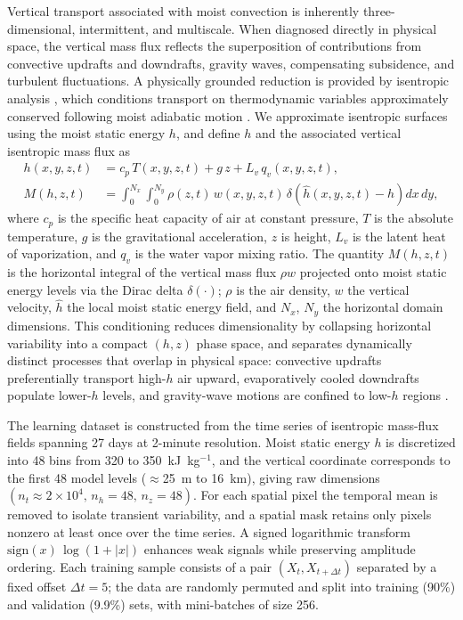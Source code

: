\documentclass[
    aps,
    prl,
    reprint,
    superscriptaddress,
    amsmath,amssymb,
    nofootinbib,
    floatfix
]{revtex4-2}
\begin{document}
Vertical transport associated with moist convection is inherently three-dimensional, intermittent, and multiscale. When diagnosed directly in physical space, the vertical mass flux reflects the superposition of contributions from convective updrafts and downdrafts, gravity waves, compensating subsidence, and turbulent fluctuations. A physically grounded reduction is provided by isentropic analysis \cite{pauluis2013isentropic}, which conditions transport on thermodynamic variables approximately conserved following moist adiabatic motion \cite{chen2022crucial}. We approximate isentropic surfaces using the moist static energy $h$, and define $h$ and the associated vertical isentropic mass flux as
\begin{align}
    h(x,y,z,t) & = c_p\, T(x,y,z,t)+ g\, z + L_v\, q_v(x,y,z,t),\\
    M(h,z,t) &= \int_{0}^{N_x}\!\!\int_{0}^{N_y} \rho(z,t)\,w(x,y,z,t)\,
    \delta\!\left(\hat{h}(x,y,z,t)-h\right)dx\,dy,
\end{align}
where $c_p$ is the specific heat capacity of air at constant pressure, $T$ is the absolute temperature, $g$ is the gravitational acceleration, $z$ is height, $L_v$ is the latent heat of vaporization, and $q_v$ is the water vapor mixing ratio. The quantity $M(h,z,t)$ is the horizontal integral of the vertical mass flux $\rho w$ projected onto moist static energy levels via the Dirac delta $\delta(\cdot)$; $\rho$ is the air density, $w$ the vertical velocity, $\hat{h}$ the local moist static energy field, and $N_x$, $N_y$ the horizontal domain dimensions. This conditioning reduces dimensionality by collapsing horizontal variability into a compact $(h,z)$ phase space, and separates dynamically distinct processes that overlap in physical space: convective updrafts preferentially transport high-$h$ air upward, evaporatively cooled downdrafts populate lower-$h$ levels, and gravity-wave motions are confined to low-$h$ regions \cite{chen2018atmospheric, chen2020significant, mrowiec2016isentropic}.

The learning dataset is constructed from the time series of isentropic mass-flux fields spanning 27 days at 2-minute resolution. Moist static energy $h$ is discretized into 48 bins from 320 to 350~kJ~kg$^{-1}$, and the vertical coordinate corresponds to the first 48 model levels ($\approx$25~m to 16~km), giving raw dimensions $(n_t \approx 2\times10^{4},\, n_h=48,\, n_z=48)$. For each spatial pixel the temporal mean is removed to isolate transient variability, and a spatial mask retains only pixels nonzero at least once over the time series. A signed logarithmic transform $\mathrm{sign}(x)\,\log(1+|x|)$ enhances weak signals while preserving amplitude ordering. Each training sample consists of a pair $(X_t, X_{t+\Delta t})$ separated by a fixed offset $\Delta t = 5$; the data are randomly permuted and split into training (90\%) and validation (9.9\%) sets, with mini-batches of size 256.
\end{document}

